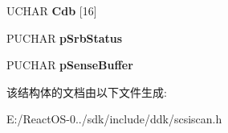 \begin{DoxyCompactItemize}
\item 
\mbox{\label{struct___s_c_s_i_s_c_a_n___c_m_d_ab2926f68b41b5140d6da6464715a5084}} 
U\+C\+H\+AR {\bfseries Cdb} \mbox{[}16\mbox{]}
\item 
\mbox{\label{struct___s_c_s_i_s_c_a_n___c_m_d_a56a56c525cee0d2e3325d686677b3758}} 
P\+U\+C\+H\+AR {\bfseries p\+Srb\+Status}
\item 
\mbox{\label{struct___s_c_s_i_s_c_a_n___c_m_d_a39cfe460c047765a2dee06685330961b}} 
P\+U\+C\+H\+AR {\bfseries p\+Sense\+Buffer}
\end{DoxyCompactItemize}


该结构体的文档由以下文件生成\+:\begin{DoxyCompactItemize}
\item 
E\+:/\+React\+O\+S-\/0../sdk/include/ddk/scsiscan.\+h\end{DoxyCompactItemize}
